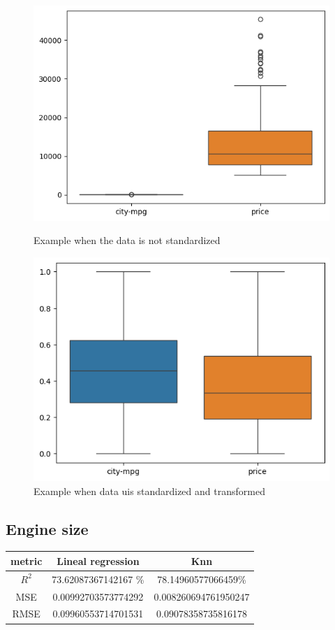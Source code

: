 \documentclass{article}
\begin{document}
\begin{figure}[H]
  \centering
  \begin{minipage}[b]{0.3\textwidth}
      \centering
      \includegraphics[width=\textwidth]{box.png}
      \caption*{Example when the data is not standardized}
      \label{fig:box}
  \end{minipage}
  \begin{minipage}[b]{0.3\textwidth}
      \centering
      \includegraphics[width=\textwidth]{box2.png}
      \caption*{Example when data uis standardized and transformed}
      \label{fig:box2}
  \end{minipage}
\end{figure}
\subsection{Engine size}
\begin{tabular}{|c|c|c|}
  \hline
   metric & Lineal regression & Knn \\ \hline
   $R^2$& 73.62087367142167 \%&78.14960577066459\%\\
   MSE& 0.00992703573774292&0.008260694761950247\\
   RMSE&0.09960553714701531&0.09078358735816178\\
   \hline
  
\end{tabular}
\end{document}
